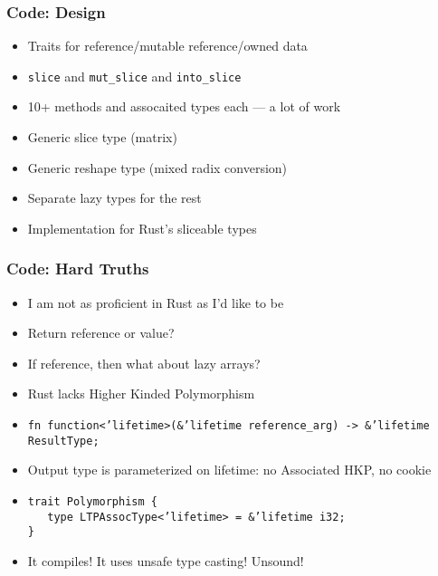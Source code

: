 \documentclass[xetex,mathserif,serif]{beamer}
\begin{document}
\begin{frame}
  \frametitle{Code: Design}
  \pause
  \begin{itemize}[<+->]
    \item Traits for reference/mutable reference/owned data
    \item \texttt{slice} and \texttt{mut\_slice} and \texttt{into\_slice}
    \item 10+ methods and assocaited types each --- a lot of work
    \item Generic slice type (matrix)
    \item Generic reshape type (mixed radix conversion)
    \item Separate lazy types for the rest
    \item Implementation for Rust's sliceable types
  \end{itemize}
\end{frame}

\begin{frame}
  \frametitle{Code: Hard Truths}
  \pause
  \begin{itemize}[<+->]
    \item I am not as proficient in Rust as I'd like to be
    \item Return reference or value?
    \item If reference, then what about lazy arrays?
    \item Rust lacks Higher Kinded Polymorphism
    \item \texttt{fn function<'lifetime>(\&'lifetime reference\_arg) -> \&'lifetime ResultType;}
    \item Output type is parameterized on lifetime: no Associated HKP, no cookie
    \item \texttt{trait Polymorphism \{\\
            \ \ \ type LTPAssocType<'lifetime> = \&'lifetime i32;\\
                  \}}
    \item It compiles! It uses unsafe type casting! Unsound!
  \end{itemize}
\end{frame}
\end{document}
